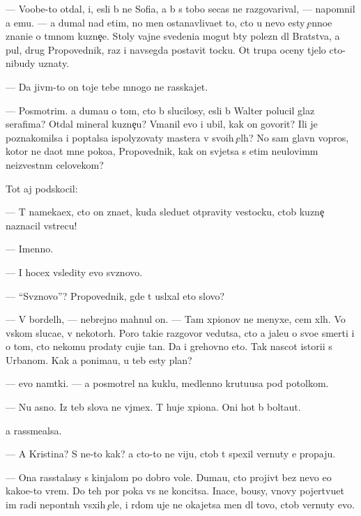 \documentclass[10pt]{book}
\begin{document}
— Voob{\x}e-to otdal, i, {\y}esli b{\yi} ne Sofi{\y}a, {\y}a b{\yi} s tobo{\y} se{\y}cas ne razgovarival, — napomnil {\y}a {\y}emu. — {\Y}a dumal nad etim, no men{\ia} ostanavliva{\y}et to, cto u nevo {\y}esty {\c}enno{\y}e znani{\y}e o t{\e}mnom kuzne{\c}e. Stoly vajn{\yi}{\y}e svedeni{\y}a mogut b{\yi}ty polezn{\yi} dl{\ia} Bratstva, a pul{\ia}, drug Pro\-po\-ved\-nik, raz i navsegda postavit tocku. Ot trupa oceny t{\ia}jelo cto-nibudy uznaty.

— Da jiv{\yi}m-to on toje tebe mnogo ne rasskajet.

— Posmotrim. {\Y}a duma{\y}u o tom, cto b{\yi} slucilosy, {\y}esli b{\yi} Walter polucil glaz serafima? Otdal mineral kuzne{\c}u? V{\yi}manil {\y}evo i ubil, kak on govorit? Ili je po\-znako\-mil\-sa i pop{\yi}talsa ispolyzovaty mastera v svo{\y}ih {\c}el{\ia}h? No sam{\yi}{\y} glavn{\yi}{\y} vopros, kotor{\yi}{\y} ne da{\y}ot mne poko{\y}a, Pro\-po\-ved\-nik, kak on sv{\ia}jetsa s etim ne\-ulo\-vi\-m{\yi}m neizvestn{\yi}m celovekom?

Tot aj podskocil:

— T{\yi} nameka{\y}ex, cto on zna{\y}et, kuda sledu{\y}et otpravity vestocku, ctob{\yi} kuzne{\c} naznacil vstrecu!

— Imenno.

— I hocex v{\yi}sledity {\y}evo sv{\ia}znovo.

— ``Sv{\ia}znovo''? Pro\-po\-ved\-nik, gde t{\yi} usl{\yi}xal eto slovo?

— V bordel{\ia}h, — nebrejno mahnul on. — Tam xpionov ne menyxe, cem xl{\io}h. Vo vs{\ia}kom sluca{\y}e, v nekotor{\yi}h. Poro{\y} taki{\y}e razgovor{\yi} vedutsa, cto {\y}a jale{\y}u o svo{\y}e{\y} smerti i o tom, cto nekomu prodaty cuji{\y}e ta{\y}n{\yi}. Da i grehovno eto. Tak nascot istori{\y}i s Urbanom. Kak {\y}a ponima{\y}u, u teb{\ia} {\y}esty plan?

— {\Y}evo nam{\e}tki. — {\Y}a posmotrel na kuklu, medlenno krut{\ia}{\x}u{\y}usa pod potolkom.

— Nu {\y}asno. Iz teb{\ia} slova ne v{\yi}jmex. T{\yi} huje xpiona. Oni hot{\ia} b{\yi} bolta{\y}ut.

{\Y}a rassme{\y}alsa.

— A Kristina? S ne{\y}-to kak? {\Y}a cto-to ne viju, ctob{\yi} t{\yi} spexil vernuty {\y}e{\y} propaju.

— Ona rasstalasy s kinjalom po dobro{\y} vole. Duma{\y}u, cto projiv{\e}t bez nevo {\y}e{\x}o kako{\y}e-to vrem{\ia}. Do teh por poka vs{\e} ne koncitsa. Inace, bo{\y}usy, vnovy pojertvu{\y}et im radi nepon{\ia}tn{\yi}h v{\yi}sxih {\c}ele{\y}, i r{\ia}dom uje ne okajetsa men{\ia} dl{\ia} tovo, ctob{\yi} vernuty {\y}evo.
\end{document}
